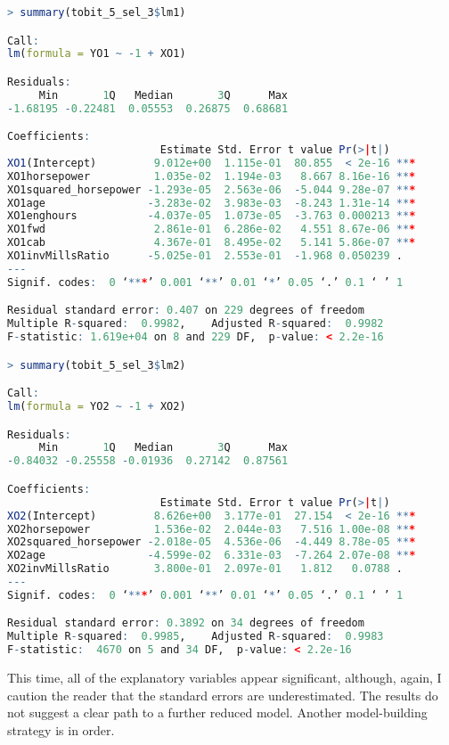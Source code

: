 \documentclass[11pt]{paper}
\begin{document}
\begin{lstlisting}[language=R]
> summary(tobit_5_sel_3$lm1)

Call:
lm(formula = YO1 ~ -1 + XO1)

Residuals:
     Min       1Q   Median       3Q      Max 
-1.68195 -0.22481  0.05553  0.26875  0.68681 

Coefficients:
                        Estimate Std. Error t value Pr(>|t|)    
XO1(Intercept)         9.012e+00  1.115e-01  80.855  < 2e-16 ***
XO1horsepower          1.035e-02  1.194e-03   8.667 8.16e-16 ***
XO1squared_horsepower -1.293e-05  2.563e-06  -5.044 9.28e-07 ***
XO1age                -3.283e-02  3.983e-03  -8.243 1.31e-14 ***
XO1enghours           -4.037e-05  1.073e-05  -3.763 0.000213 ***
XO1fwd                 2.861e-01  6.286e-02   4.551 8.67e-06 ***
XO1cab                 4.367e-01  8.495e-02   5.141 5.86e-07 ***
XO1invMillsRatio      -5.025e-01  2.553e-01  -1.968 0.050239 .  
---
Signif. codes:  0 ‘***’ 0.001 ‘**’ 0.01 ‘*’ 0.05 ‘.’ 0.1 ‘ ’ 1

Residual standard error: 0.407 on 229 degrees of freedom
Multiple R-squared:  0.9982,	Adjusted R-squared:  0.9982 
F-statistic: 1.619e+04 on 8 and 229 DF,  p-value: < 2.2e-16

> summary(tobit_5_sel_3$lm2)

Call:
lm(formula = YO2 ~ -1 + XO2)

Residuals:
     Min       1Q   Median       3Q      Max 
-0.84032 -0.25558 -0.01936  0.27142  0.87561 

Coefficients:
                        Estimate Std. Error t value Pr(>|t|)    
XO2(Intercept)         8.626e+00  3.177e-01  27.154  < 2e-16 ***
XO2horsepower          1.536e-02  2.044e-03   7.516 1.00e-08 ***
XO2squared_horsepower -2.018e-05  4.536e-06  -4.449 8.78e-05 ***
XO2age                -4.599e-02  6.331e-03  -7.264 2.07e-08 ***
XO2invMillsRatio       3.800e-01  2.097e-01   1.812   0.0788 .  
---
Signif. codes:  0 ‘***’ 0.001 ‘**’ 0.01 ‘*’ 0.05 ‘.’ 0.1 ‘ ’ 1

Residual standard error: 0.3892 on 34 degrees of freedom
Multiple R-squared:  0.9985,	Adjusted R-squared:  0.9983 
F-statistic:  4670 on 5 and 34 DF,  p-value: < 2.2e-16
\end{lstlisting}

This time, all of the explanatory variables appear significant, 
although, again, I caution the reader that the standard errors are underestimated. 
The results do not suggest a clear path to a further reduced model. 
Another model-building strategy is in order. 
\end{document}
